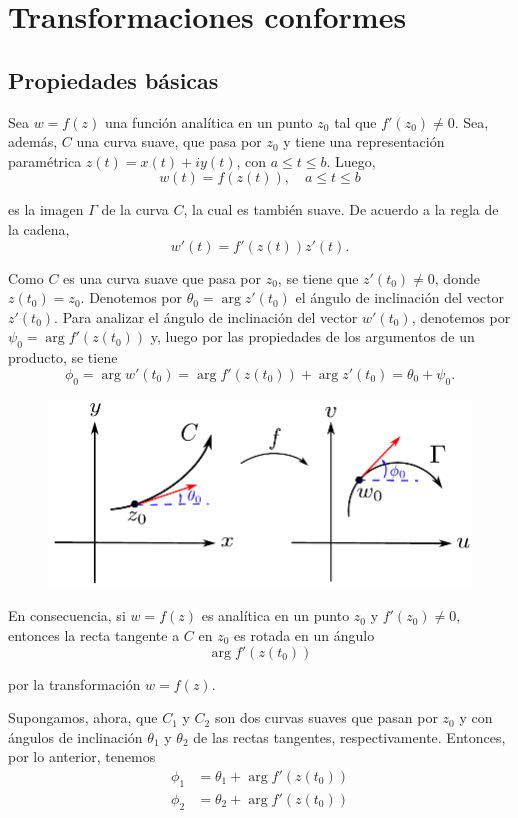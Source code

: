 \chapter{Transformaciones conformes}

\section{Propiedades básicas}

Sea $w = f(z)$ una función analítica en un punto $z_0$ tal que $f'(z_0) \neq 0$. Sea, además, $C$ una curva suave, que pasa por $z_0$ y tiene una representación paramétrica $z(t) = x(t) + iy(t)$, con $a \leq t\leq b$. Luego,
$$w(t) = f(z(t)), \quad a \leq t \leq b$$

es la imagen $\Gamma$ de la curva $C$, la cual es también suave. De acuerdo a la regla de la cadena,
$$w'(t) = f'(z(t)) z'(t).$$

Como $C$ es una curva suave que pasa por $z_0$, se tiene que $z'(t_0) \neq 0$, donde $z(t_0) = z_0$. Denotemos por $\theta_0 = \arg z'(t_0)$ el ángulo de inclinación del vector $z'(t_0)$. Para analizar el ángulo de inclinación del vector $w'(t_0)$, denotemos por $\psi_0 = \arg f'(z(t_0))$ y, luego por las propiedades de los argumentos de un producto, se tiene
$$\phi_0 = \arg w'(t_0) = \arg f'(z(t_0)) + \arg z'(t_0) = \theta_0 + \psi_0.$$

\begin{figure}[H]
    \centering
    \includegraphics[scale = 0.75]{Figuras/MapeoConforme1.pdf}
    \caption{}
    \label{fig:Conforme1}
\end{figure}

En consecuencia, si $w = f(z)$ es analítica en un punto $z_0$ y $f'(z_0) \neq 0$, entonces la recta tangente a $C$ en $z_0$ es rotada en un ángulo
$$\arg f'(z(t_0))$$

por la transformación $w = f(z)$.

Supongamos, ahora, que $C_1$ y $C_2$ son dos curvas suaves que pasan por $z_0$ y con ángulos de inclinación $\theta_1$ y $\theta_2$ de las rectas tangentes, respectivamente. Entonces, por lo anterior, tenemos
\begin{align*}
    \phi_1 &= \theta_1 + \arg f'(z(t_0)) \\
    \phi_2 &= \theta_2 + \arg f'(z(t_0))
\end{align*}

